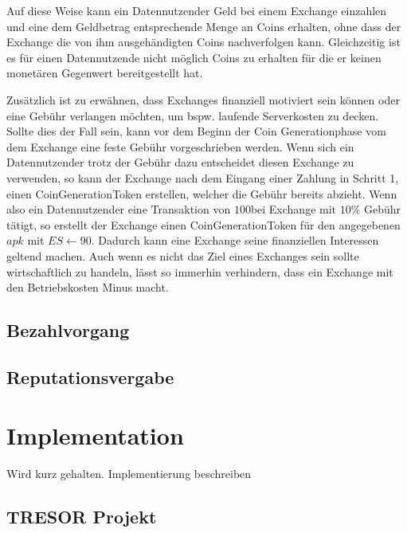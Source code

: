 \documentclass[11pt,a4paper]{scrreprt}
\begin{document}
Auf diese Weise kann ein Datennutzender Geld bei einem Exchange einzahlen und eine dem Geldbetrag entsprechende Menge an Coins erhalten, ohne dass der Exchange die von ihm ausgehändigten Coins nachverfolgen kann. Gleichzeitig ist es für einen Datennutzende nicht möglich Coins zu erhalten für die er keinen monetären Gegenwert bereitgestellt hat.

Zusätzlich ist zu erwähnen, dass Exchanges finanziell motiviert sein können oder eine Gebühr verlangen möchten, um bspw. laufende Serverkosten zu decken. Sollte dies der Fall sein, kann vor dem Beginn der Coin Generationphase vom dem Exchange eine feste Gebühr vorgeschrieben werden. Wenn sich ein Datennutzender trotz der Gebühr dazu entscheidet diesen Exchange zu verwenden, so kann der Exchange nach dem Eingang einer Zahlung in Schritt 1, einen CoinGenerationToken erstellen, welcher die Gebühr bereits abzieht. Wenn also ein Datennutzender eine Transaktion von $100$\texteuro bei Exchange mit $10\%$ Gebühr tätigt, so erstellt der Exchange einen CoinGenerationToken für den angegebenen $apk$ mit $ES \leftarrow 90$\texteuro. Dadurch kann eine Exchange seine finanziellen Interessen geltend machen. Auch wenn es nicht das Ziel eines Exchanges sein sollte wirtschaftlich zu handeln, lässt so immerhin verhindern, dass ein Exchange mit den Betriebskosten Minus macht.

\section{Bezahlvorgang}

\section{Reputationsvergabe}




\chapter{Implementation}
Wird kurz gehalten. Implementierung beschreiben

\section{TRESOR Projekt}

\end{document}
